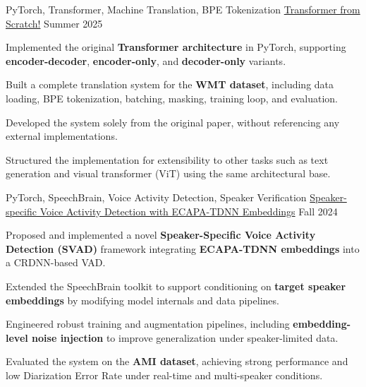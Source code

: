 

\begin{cventries}

\cventry
  {PyTorch, Transformer, Machine Translation, BPE Tokenization} %
  {\href{https://github.com/radinshayanfar/transformer}{Transformer from Scratch!}} %
  {} %
  {Summer 2025} %
  {
    \begin{cvitems}
      \item {Implemented the original \textbf{Transformer architecture} in PyTorch, supporting \textbf{encoder-decoder}, \textbf{encoder-only}, and \textbf{decoder-only} variants.}
      \item {Built a complete translation system for the \textbf{WMT dataset}, including data loading, BPE tokenization, batching, masking, training loop, and evaluation.}
      \item {Developed the system solely from the original paper, without referencing any external implementations.}
      \item {Structured the implementation for extensibility to other tasks such as text generation and visual transformer (ViT) using the same architectural base.}
    \end{cvitems}
  }

\cventry
    {PyTorch, SpeechBrain, Voice Activity Detection, Speaker Verification} %
    {\href{https://github.com/radinshayanfar/speechbrain}{Speaker-specific Voice Activity Detection with ECAPA-TDNN Embeddings}} %
    {} %
    {Fall 2024} %
    {
      \begin{cvitems}
        \item {Proposed and implemented a novel \textbf{Speaker-Specific Voice Activity Detection (SVAD)} framework integrating \textbf{ECAPA-TDNN embeddings} into a CRDNN-based VAD.}
        \item {Extended the SpeechBrain toolkit to support conditioning on \textbf{target speaker embeddings} by modifying model internals and data pipelines.}
        \item {Engineered robust training and augmentation pipelines, including \textbf{embedding-level noise injection} to improve generalization under speaker-limited data.}
        \item {Evaluated the system on the \textbf{AMI dataset}, achieving strong performance and low Diarization Error Rate under real-time and multi-speaker conditions.}
      \end{cvitems}
    }
    

\end{cventries}
